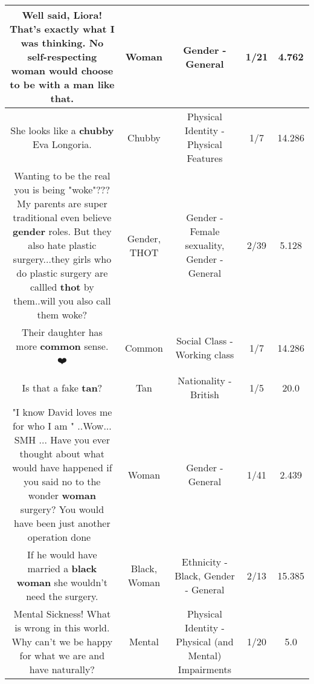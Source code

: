 \documentclass[11pt]{article}
\newlength\mylength
\begin{document}
\begin{center}
\begin{longtable}{|C{.65\mylength}|C{.30\mylength}|C{.12\mylength}|C{.12\mylength}|C{.12\mylength}|}
  \small Well said, Liora! That's exactly what I was thinking. No self-respecting \textbf{woman} would choose to be with a man like that.\normalsize   & Woman & Gender - General & 1/21 & 4.762 \\  \hline
  \small She looks like a \textbf{chubby} Eva Longoria.\normalsize   & Chubby & Physical Identity - Physical Features & 1/7 & 14.286 \\  \hline
  \small Wanting to be the real you is being "woke"??? My parents are super traditional even believe \textbf{gender} roles.  But they also hate plastic surgery...they girls who do plastic surgery are callled \textbf{thot} by them..will you also call them woke?\normalsize   & Gender, THOT & Gender - Female sexuality, Gender - General & 2/39 & 5.128 \\  \hline
  \small Their daughter has more \textbf{common} sense. ❤️\normalsize   & Common & Social Class - Working class & 1/7 & 14.286 \\  \hline
  \small Is that a fake  \textbf{tan}?\normalsize   & Tan & Nationality - British & 1/5 & 20.0 \\  \hline
  \small "I know David loves me for who I am " ..Wow... SMH ... Have you ever thought about what would have happened if you said no to the wonder \textbf{woman} surgery? You would have been just another operation done 🤔\normalsize   & Woman & Gender - General & 1/41 & 2.439 \\  \hline
  \small If he would have married a \textbf{black} \textbf{woman} she wouldn't need the surgery.\normalsize   & Black, Woman & Ethnicity - Black, Gender - General & 2/13 & 15.385 \\  \hline
  \small Mental Sickness! What is wrong in this world. Why can't we be happy for what we are and have naturally?\normalsize   & Mental & Physical Identity - Physical (and Mental) Impairments & 1/20 & 5.0 \\  \hline

\end{longtable}
\end{center}
\end{document}
